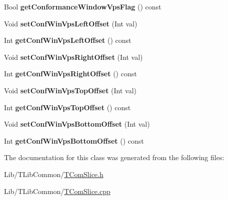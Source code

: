 \begin{DoxyCompactItemize}
\item 
\mbox{\label{class_t_com_rep_format_af0bc911c349e8ff51f1b2bcaa220324b}} 
Bool {\bfseries get\+Conformance\+Window\+Vps\+Flag} () const
\item 
\mbox{\label{class_t_com_rep_format_abc42640ba8c77b9edfe47dad6f3f8e0b}} 
Void {\bfseries set\+Conf\+Win\+Vps\+Left\+Offset} (Int val)
\item 
\mbox{\label{class_t_com_rep_format_a93ea5331c47b3a81b08971c338eaae20}} 
Int {\bfseries get\+Conf\+Win\+Vps\+Left\+Offset} () const
\item 
\mbox{\label{class_t_com_rep_format_af2edee9f3c57ccbdce9753c2bbf2ba17}} 
Void {\bfseries set\+Conf\+Win\+Vps\+Right\+Offset} (Int val)
\item 
\mbox{\label{class_t_com_rep_format_af3d1c115ad5f5e9c61bbd2a41f5a84d2}} 
Int {\bfseries get\+Conf\+Win\+Vps\+Right\+Offset} () const
\item 
\mbox{\label{class_t_com_rep_format_a6e92bceab038100dd9c837b9ae062898}} 
Void {\bfseries set\+Conf\+Win\+Vps\+Top\+Offset} (Int val)
\item 
\mbox{\label{class_t_com_rep_format_a80b9258a36beeee1ea4577b512900b83}} 
Int {\bfseries get\+Conf\+Win\+Vps\+Top\+Offset} () const
\item 
\mbox{\label{class_t_com_rep_format_ac7d2ddd009f9e4767703da1343c4e676}} 
Void {\bfseries set\+Conf\+Win\+Vps\+Bottom\+Offset} (Int val)
\item 
\mbox{\label{class_t_com_rep_format_af306b02bac59cc7d11aef88afd918d4f}} 
Int {\bfseries get\+Conf\+Win\+Vps\+Bottom\+Offset} () const
\end{DoxyCompactItemize}


The documentation for this class was generated from the following files\+:\begin{DoxyCompactItemize}
\item 
Lib/\+T\+Lib\+Common/\hyperlink{_t_com_slice_8h}{T\+Com\+Slice.\+h}\item 
Lib/\+T\+Lib\+Common/\hyperlink{_t_com_slice_8cpp}{T\+Com\+Slice.\+cpp}\end{DoxyCompactItemize}
